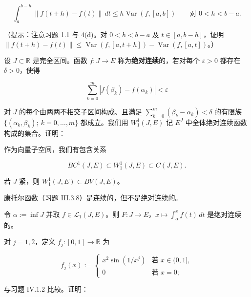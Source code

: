 \begin{exercises}
\[
\int_a^{b-h} \|f(t+h) - f(t)\| \, dt \le h \operatorname{Var}(f,[a,b]) \qquad \text{对 } 0 < h < b - a .
\]

（提示：注意习题 1.1 与 4(d)。对 $ 0 < h < b - a $ 及 $ t \in [a,b-h] $，证明 $ \|f(t+h) - f(t)\| \le \operatorname{Var}(f,[a,t+h]) - \operatorname{Var}(f,[a,t]) $。）

\item

设 $ J \subset \mathbb{R} $ 是完全区间。函数 $ f: J \to E $ 称为\textbf{绝对连续}的，若对每个 $ \varepsilon > 0 $ 都存在 $ \delta > 0 $，使得

\[
\sum_{k=0}^{m} |f(\beta_k) - f(\alpha_k)| < \varepsilon
\]

对 $ J $ 的每个由两两不相交子区间构成、且满足 $ \sum_{k=0}^{m} (\beta_k - \alpha_k) < \delta $ 的有限族 $ \{ (\alpha_k, \beta_k) ;\ k = 0, \ldots, m \} $ 都成立。我们用 $ W_1^1(J,E) $ 记 $ E^J $ 中全体绝对连续函数构成的集合。证明：

\begin{items}
\item

作为向量子空间，我们有包含关系

\[
BC^1(J,E) \subset W_1^1(J,E) \subset C(J,E) .
\]
\item

若 $ J $ 紧，则 $ W_1^1(J,E) \subset BV(J,E) $。

\item

康托尔函数（习题 III.3.8）是连续的，但不是绝对连续的。

\item

令 $ \alpha := \inf J $ 并取 $ f \in \mathcal{L}_1(J,E) $。则 $ F: J \to E $，$ x \mapsto \int_\alpha^x f(t) \, dt $ 是绝对连续的。

\end{items}

\item

对 $ j = 1, 2 $，定义 $ f_j: [0,1] \to \mathbb{R} $ 为

\begin{equation*}
f_j(x) := \begin{cases} x^2 \sin(1/x^j) & \text{若 } x \in (0,1], \\ 0 & \text{若 } x = 0 ; \end{cases}
\end{equation*}

与习题 IV.1.2 比较。证明：


\end{exercises}
